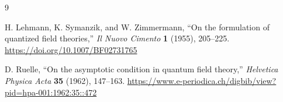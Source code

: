 \documentclass[11pt]{article}
\begin{document}
\begin{thebibliography}{9}

H. Lehmann, K. Symanzik, and W. Zimmermann,
``On the formulation of quantized field theories,''
\emph{Il Nuovo Cimento} \textbf{1} (1955), 205--225.
\url{https://doi.org/10.1007/BF02731765}

D. Ruelle,
``On the asymptotic condition in quantum field theory,''
\emph{Helvetica Physica Acta} \textbf{35} (1962), 147--163.
\url{https://www.e-periodica.ch/digbib/view?pid=hpa-001:1962:35::472}

\end{thebibliography}
\end{document}
